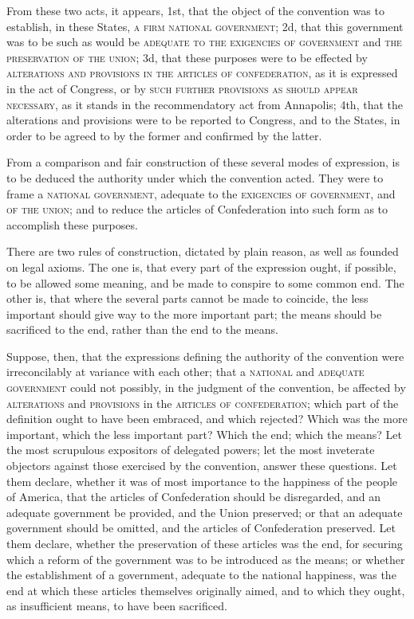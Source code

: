 From these two acts, it appears, 1st, that the object of the convention was to establish, in these States, \textsc{a firm national government}; 2d, that this government was to be such as would be \textsc{adequate to the exigencies of government }and \textsc{the preservation of the union}; 3d, that these purposes were to be effected by \textsc{alterations and provisions in the articles of confederation}, as it is expressed in the act of Congress, or by \textsc{such further provisions as should appear necessary}, as it stands in the recommendatory act from Annapolis; 4th, that the alterations and provisions were to be reported to Congress, and to the States, in order to be agreed to by the former and confirmed by the latter.

From a comparison and fair construction of these several modes of expression, is to be deduced the authority under which the convention acted. They were to frame a \textsc{national government}, adequate to the \textsc{exigencies of government}, and \textsc{of the union}; and to reduce the articles of Confederation into such form as to accomplish these purposes.

There are two rules of construction, dictated by plain reason, as well as founded on legal axioms. The one is, that every part of the expression ought, if possible, to be allowed some meaning, and be made to conspire to some common end. The other is, that where the several parts cannot be made to coincide, the less important should give way to the more important part; the means should be sacrificed to the end, rather than the end to the means.

Suppose, then, that the expressions defining the authority of the convention were irreconcilably at variance with each other; that a \textsc{national }and \textsc{adequate government }could not possibly, in the judgment of the convention, be affected by \textsc{alterations }and \textsc{provisions }in the \textsc{articles of confederation}; which part of the definition ought to have been embraced, and which rejected? Which was the more important, which the less important part? Which the end; which the means? Let the most scrupulous expositors of delegated powers; let the most inveterate objectors against those exercised by the convention, answer these questions. Let them declare, whether it was of most importance to the happiness of the people of America, that the articles of Confederation should be disregarded, and an adequate government be provided, and the Union preserved; or that an adequate government should be omitted, and the articles of Confederation preserved. Let them declare, whether the preservation of these articles was the end, for securing which a reform of the government was to be introduced as the means; or whether the establishment of a government, adequate to the national happiness, was the end at which these articles themselves originally aimed, and to which they ought, as insufficient means, to have been sacrificed.

